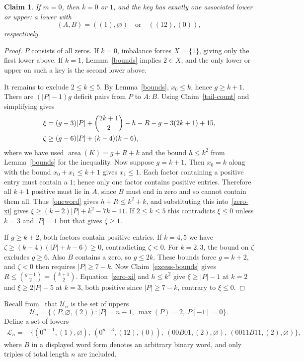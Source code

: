 \documentclass[11pt]{article}
\DeclareMathOperator{\area}{area}\DeclareMathOperator{\dinv}{dinv}
\newtheorem{claim}{Claim}
\begin{document}
\begin{claim}\label{zero-maximum}
If $m=0$, then $k=0$ or $1$, and the key has exactly one associated lower or upper: a lower with
\[
 (A,B)=((1),\varnothing)\quad\text{or}\quad((12),(0)),
\]
respectively.
\end{claim}
\begin{proof}
$P$ consists of all zeros. If $k=0$, imbalance forces $X=\{1\}$, giving only the first lower above. If $k=1$, Lemma~\ref{bounds} implies $2\in X$, and the only lower or upper on such a key is the second lower above.

It remains to exclude $2\le k\le5$. By Lemma~\ref{bounds}, $x_0\le k$, hence $g\ge k+1$. There are $(|P|-1)g$ deficit pairs from $P$ to $A:B$. Using Claim~\ref{tail-count} and simplifying gives
\begin{align}
 \xi&=(g-3)|P|+\binom{2k+1}{2}-h-R-g-3(2k+1)+15,\label{zero-xi}\\
 \zeta&\ge(g-6)|P|+(k-4)(k-6),\notag
\end{align}
where we have used $\area(K)=g+R+k$ and the bound $h\le k^2$ from Lemma~\ref{bounds} for the inequality.
Now suppose $g=k+1$.  Then $x_0=k$ along with the bound $x_0+x_1\le k+1$ gives $x_1\le1$. Each factor containing a positive entry must contain a $1$; hence only one factor contains positive entries. Therefore all $k+1$ positive must lie in $A$, since $B$ must end in zero and so cannot contain them all. Thus~\eqref{oneword} gives $h+R\le k^2+k$, and substituting this into~\eqref{zero-xi} gives $\xi\ge(k-2)|P|+k^2-7k+11$. If $2\le k\le5$ this contradicts $\xi\le0$  unless $k=3$ and $|P|=1$ but that gives $\zeta\ge1$.

If $g\ge k+2$, both factors contain positive entries. If $k=4,5$ we have $\zeta\ge(k-4)(|P|+k-6)\ge0$, contradicting $\zeta<0$. For $k=2,3$, the bound on $\zeta$ excludes $g\ge6$. Also $B$ contains a zero, so $g\le2k$. These bounds force $g=k+2$, and $\zeta<0$ then requires $|P|\ge7-k$. Now Claim~\ref{excess-bounds} gives $R\le\binom{g-1}2=\binom{k+1}2$. Equation~\eqref{zero-xi} and $h\le k^2$ give $\xi\ge |P|-1$ at $k=2$ and $\xi\ge2|P|-5$ at $k=3$, both positive since $|P|\ge7-k$, contrary to $\xi\le0$.
\end{proof}

Recall from~\cite[\S6.3]{H} that $\mathcal U_n$ is the set of uppers
\[
 \mathcal U_n=\{(P,\varnothing,(2)):|P|=n-1,\ \max(P)=2,\ P[-1]=0\}.
\]
Define a set of lowers
\[
 \begin{aligned}
 \mathcal L_n={}&\{(0^{n-1},(1),\varnothing),\ (0^{n-3},(12),(0)),\ (00B01,(2),\varnothing),\ (0011B11,(2),\varnothing)\},
 \end{aligned}
\]
where $B$ in a displayed word form denotes an arbitrary binary word, and only triples of total length $n$ are included.
\end{document}
